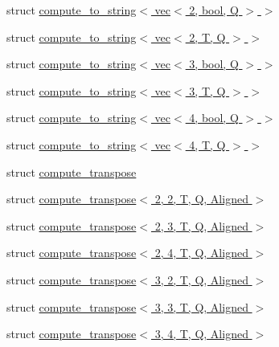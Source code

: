 \begin{DoxyCompactItemize}
\item 
struct \hyperlink{structglm_1_1detail_1_1compute__to__string_3_01vec_3_012_00_01bool_00_01_q_01_4_01_4}{compute\+\_\+to\+\_\+string$<$ vec$<$ 2, bool, Q $>$ $>$}
\item 
struct \hyperlink{structglm_1_1detail_1_1compute__to__string_3_01vec_3_012_00_01_t_00_01_q_01_4_01_4}{compute\+\_\+to\+\_\+string$<$ vec$<$ 2, T, Q $>$ $>$}
\item 
struct \hyperlink{structglm_1_1detail_1_1compute__to__string_3_01vec_3_013_00_01bool_00_01_q_01_4_01_4}{compute\+\_\+to\+\_\+string$<$ vec$<$ 3, bool, Q $>$ $>$}
\item 
struct \hyperlink{structglm_1_1detail_1_1compute__to__string_3_01vec_3_013_00_01_t_00_01_q_01_4_01_4}{compute\+\_\+to\+\_\+string$<$ vec$<$ 3, T, Q $>$ $>$}
\item 
struct \hyperlink{structglm_1_1detail_1_1compute__to__string_3_01vec_3_014_00_01bool_00_01_q_01_4_01_4}{compute\+\_\+to\+\_\+string$<$ vec$<$ 4, bool, Q $>$ $>$}
\item 
struct \hyperlink{structglm_1_1detail_1_1compute__to__string_3_01vec_3_014_00_01_t_00_01_q_01_4_01_4}{compute\+\_\+to\+\_\+string$<$ vec$<$ 4, T, Q $>$ $>$}
\item 
struct \hyperlink{structglm_1_1detail_1_1compute__transpose}{compute\+\_\+transpose}
\item 
struct \hyperlink{structglm_1_1detail_1_1compute__transpose_3_012_00_012_00_01_t_00_01_q_00_01_aligned_01_4}{compute\+\_\+transpose$<$ 2, 2, T, Q, Aligned $>$}
\item 
struct \hyperlink{structglm_1_1detail_1_1compute__transpose_3_012_00_013_00_01_t_00_01_q_00_01_aligned_01_4}{compute\+\_\+transpose$<$ 2, 3, T, Q, Aligned $>$}
\item 
struct \hyperlink{structglm_1_1detail_1_1compute__transpose_3_012_00_014_00_01_t_00_01_q_00_01_aligned_01_4}{compute\+\_\+transpose$<$ 2, 4, T, Q, Aligned $>$}
\item 
struct \hyperlink{structglm_1_1detail_1_1compute__transpose_3_013_00_012_00_01_t_00_01_q_00_01_aligned_01_4}{compute\+\_\+transpose$<$ 3, 2, T, Q, Aligned $>$}
\item 
struct \hyperlink{structglm_1_1detail_1_1compute__transpose_3_013_00_013_00_01_t_00_01_q_00_01_aligned_01_4}{compute\+\_\+transpose$<$ 3, 3, T, Q, Aligned $>$}
\item 
struct \hyperlink{structglm_1_1detail_1_1compute__transpose_3_013_00_014_00_01_t_00_01_q_00_01_aligned_01_4}{compute\+\_\+transpose$<$ 3, 4, T, Q, Aligned $>$}

\end{DoxyCompactItemize}
